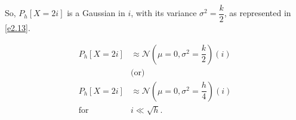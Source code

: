 \vspace{10pt}
\noindent So, $P_h[X = 2i]$ is a Gaussian in $i$, with its variance
$\sigma^2 = \dfrac{k}{2}$, as represented in \ref{e2.13}.

\begin{equation}
    \begin{aligned}
        P_h[X = 2i] &\approx
        \mathcal{N}\left(\mu = 0, \sigma^2 = \dfrac{k}{2}\right)(i) \\
        &\text{(or)} \\
        P_h[X = 2i] &\approx
        \mathcal{N}\left(\mu = 0, \sigma^2 = \dfrac{h}{4}\right)(i) \\
        \text{for } &i \ll \sqrt{h}.
    \end{aligned}
    \label{e2.13}
\end{equation}
